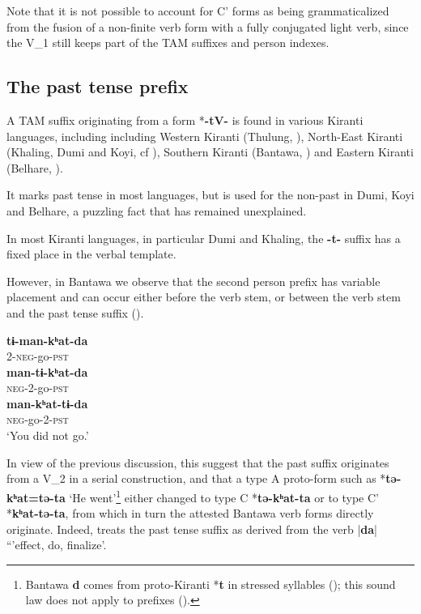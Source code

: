 \documentclass[oneside,a4paper,11pt]{article}
\newcommand{\ipa}[1]{{\phon\textbf{#1}}}
\newcommand{\dhatu}[2]{|\ipa{#1}| `#2'}
\begin{document}
Note that it is not possible to account for C' forms as being grammaticalized from the fusion of a non-finite verb form with a fully conjugated light verb, since the V_1 still keeps part of the TAM suffixes and person indexes.



\subsection{The past tense prefix} \label{sec:pst}
A TAM suffix originating from a form *\ipa{-tV-} is found in various Kiranti languages, including including Western Kiranti (Thulung, \citealt{lahaussois03}), North-East Kiranti (Khaling, Dumi and Koyi, cf \citealt{driem93dumi, lahaussois09, jacques12khaling}), Southern Kiranti (Bantawa, \citealt{doornenbal09}) and Eastern Kiranti (Belhare, \citealt[551]{bickel03belhare}).

It marks past tense in most languages, but is used for the non-past in Dumi, Koyi and Belhare, a puzzling fact that has remained unexplained.

In most Kiranti languages, in particular Dumi and Khaling, the \ipa{-t-} suffix has a fixed place in the verbal template. 

However, in Bantawa we observe that the second person prefix has variable placement and can occur either before the verb stem, or between the verb stem and the past tense suffix (\citealt[171]{doornenbal09}).

\begin{exe}
\ex \label{ex:timankhatda}
\gll 
\ipa{tɨ-man-kʰat-da} \\
2-\textsc{neg}-go-\textsc{pst} \\
\ex
\gll 
\ipa{man-tɨ-kʰat-da} \\
\textsc{neg}-2-go-\textsc{pst} \\
\ex 
\gll 
\ipa{man-kʰat-tɨ-da} \\
\textsc{neg}-go-2-\textsc{pst} \\
\glt `You did not go.'
\end{exe}

In view of the previous discussion, this suggest that the past suffix originates from a V_2 in a serial construction, and that a type A proto-form such as *\ipa{tə-kʰat=tə-ta} `He went'\footnote{Bantawa \ipa{d} comes from proto-Kiranti *\ipa{t} in stressed syllables (\citealt{michailovsky94stops}); this sound law does not apply to prefixes (\citealt{jacques12agreement}).} either changed to type C *\ipa{tə-kʰat-ta} or to type C' *\ipa{kʰat-tə-ta}, from which in turn the attested Bantawa verb forms directly originate. Indeed, \citet[165;272]{doornenbal09} treats the past tense suffix as derived from the verb \dhatu{da} `effect, do, finalize'.
\end{document}
